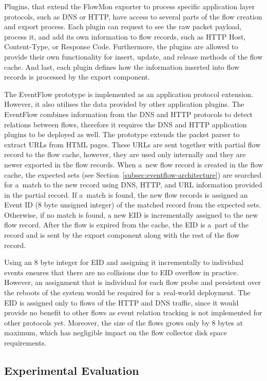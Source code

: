 Plugins, that extend the FlowMon exporter to process specific application layer protocols, such as DNS or HTTP, have access to several parts of the flow creation and export process. Each plugin can request to see the raw packet payload, process it, and add its own information to flow records, such as HTTP Host, Content-Type, or Response Code. Furthermore, the plugins are allowed to provide their own functionality for insert, update, and release methods of the flow cache. And last, each plugin defines how the information inserted into flow records is processed by the export component.

The EventFlow prototype is implemented as an application protocol extension. However, it also utilises the data provided by other application plugins. The EventFlow combines information from the DNS and HTTP protocols to detect relations between flows, therefore it requires the DNS and HTTP application plugins to be deployed as well. The prototype extends the packet parser to extract URLs from HTML pages. These URLs are sent together with partial flow record to the flow cache, however, they are used only internally and they are newer exported in the flow records. When a~new flow record is created in the flow cache, the expected sets (see Section~\ref{subsec:eventflow-architecture}) are searched for a~match to the new record using DNS, HTTP, and URL information provided in the partial record. If a~match is found, the new flow records is assigned an Event ID (8 byte unsigned integer) of the matched record from the expected sets. Otherwise, if no match is found, a new EID is incrementally assigned to the new flow record. After the flow is expired from the cache, the EID is a~part of the record and is sent by the export component along with the rest of the flow record.

Using an 8 byte integer for EID and assigning it incrementally to individual events ensures that there are no collisions due to EID overflow in practice. However, an assignment that is individual for each flow probe and persistent over the reboots of the system would be required for a~real-world deployment. The EID is assigned only to flows of the HTTP and DNS traffic, since it would provide no benefit to other flows as event relation tracking is not implemented for other protocols yet. Moreover, the size of the flows grows only by 8 bytes at maximum, which has negligible impact on the flow collector disk space requirements.


\subsection{Experimental Evaluation} \label{subsec:eventflow-evaluation}


